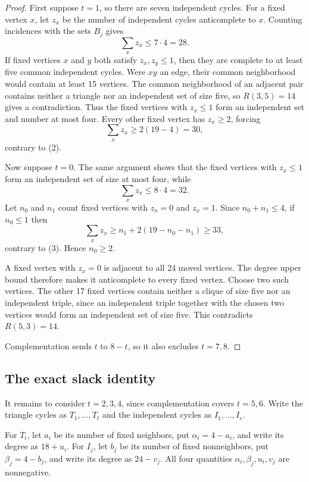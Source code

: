 \documentclass[11pt]{article}
\begin{document}
\begin{proof}
First suppose $t=1$, so there are seven independent cycles. For a fixed
vertex $x$, let $z_x$ be the number of independent cycles anticomplete to
$x$. Counting incidences with the sets $B_j$ gives
\[
\sum_x z_x\le7\cdot4=28. \tag{2}
\]
If fixed vertices $x$ and $y$ both satisfy $z_x,z_y\le1$, then they are
complete to at least five common independent cycles. Were $xy$ an edge,
their common neighborhood would contain at least 15 vertices. The common
neighborhood of an adjacent pair contains neither a triangle nor an
independent set of size five, so $R(3,5)=14$ gives a contradiction. Thus the
fixed vertices with $z_x\le1$ form an independent set and number at most
four. Every other fixed vertex has $z_x\ge2$, forcing
\[
\sum_x z_x\ge2(19-4)=30,
\]
contrary to (2).

Now suppose $t=0$. The same argument shows that the fixed vertices with
$z_x\le1$ form an independent set of size at most four, while
\[
\sum_x z_x\le8\cdot4=32. \tag{3}
\]
Let $n_0$ and $n_1$ count fixed vertices with $z_x=0$ and $z_x=1$.
Since $n_0+n_1\le4$, if $n_0\le1$ then
\[
\sum_x z_x\ge n_1+2(19-n_0-n_1)\ge33,
\]
contrary to (3). Hence $n_0\ge2$.

A fixed vertex with $z_x=0$ is adjacent to all 24 moved vertices. The degree
upper bound therefore makes it anticomplete to every fixed vertex. Choose
two such vertices. The other 17 fixed vertices contain neither a clique of
size five nor an independent triple, since an independent triple together
with the chosen two vertices would form an independent set of size five.
This contradicts $R(5,3)=14$.

Complementation sends $t$ to $8-t$, so it also excludes $t=7,8$.
\end{proof}

\subsection{The exact slack identity}

It remains to consider $t=2,3,4$, since complementation covers $t=5,6$.
Write the triangle cycles as $T_1,\ldots,T_t$ and the independent cycles as
$I_1,\ldots,I_s$.

For $T_i$, let $a_i$ be its number of fixed neighbors, put
$\alpha_i=4-a_i$, and write its degree as $18+u_i$. For $I_j$, let $b_j$ be
its number of fixed nonneighbors, put $\beta_j=4-b_j$, and write its degree
as $24-v_j$. All four quantities $\alpha_i,\beta_j,u_i,v_j$ are
nonnegative.
\end{document}

